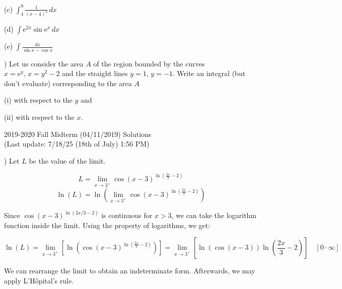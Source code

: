 \documentclass{article}
\begin{document}
\hfill

\noindent (c) $\displaystyle \int_4^8 \frac{1}{(x-4)^3}\, dx$

\hfill

\noindent (d) $\displaystyle \int\mathrm{e}^{2x}\sin \mathrm{e}^x\,dx$

\hfill

\noindent (e) $\displaystyle \int\frac{dx}{\sin x - \cos x}$

\hfill

) Let us consider the area $A$ of the region bounded by the curves $x=\mathrm{e}^y, \, x=y^2-2$ and the straight lines $y=1, \, y=-1$. Write an integral (but don't evaluate) corresponding to the area $A$

\hfill

\noindent (i) with respect to the $y$ and

\noindent (ii) with respect to the $x$.

\newpage

\begin{center}
2019-2020 Fall Midterm (04/11/2019) Solutions\\
(Last update: 7/18/25 (18th of July) 1:56 PM)
\end{center}

) Let $L$ be the value of the limit.

\begin{equation*} L = \lim_{x\to3^+}\cos(x-3)^{\ln\left(\frac{2x}{3}-2\right)}\end{equation*}
\begin{equation*}\ln(L) =\ln\left( \lim_{x\to3^+}\cos(x-3)^{\ln\left(\frac{2x}{3}-2\right)}\right)\end{equation*}

\hfill

\noindent Since $\cos(x-3)^{\ln(2x/3 -2)}$ is continuous for $x>3$, we can take the logarithm function inside the limit. Using the property of logarithms, we get:

\begin{equation*}\ln(L) =\lim_{x\to3^+}\left[ \ln\left(\cos(x-3)^{\ln\left(\frac{2x}{3}-2\right)}\right)\right] = \lim_{x\to3^+}\left[ \ln\left(\cos(x-3)\right)\ln\left(\frac{2x}{3}-2\right)\right]\quad[0 \cdot \infty] \end{equation*}

\hfill

\noindent We can rearrange the limit to obtain an indeterminate form. Afterwards, we may apply L'Hôpital's rule.
\end{document}
